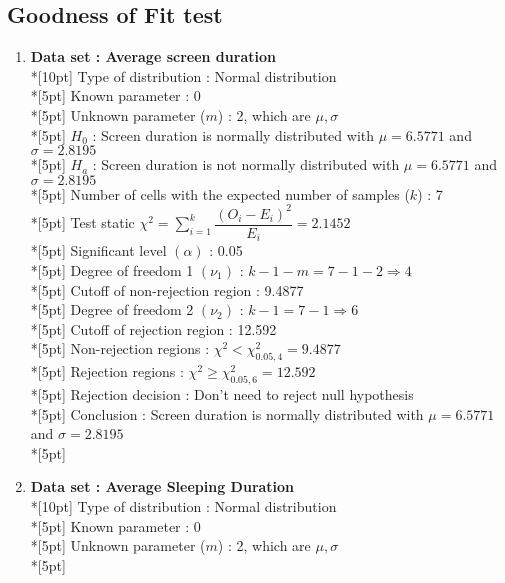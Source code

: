 \subsection*{Goodness of Fit test}
\begin{enumerate}
    \item \textbf{Data set : Average screen duration}\\*[10pt]
        Type of distribution : Normal distribution\\*[5pt]
        Known parameter : 0\\*[5pt]
        Unknown parameter ($m$) : 2, which are \(\mu, \sigma\)\\*[5pt]
        $H_0$ : Screen duration is normally distributed with $\mu=6.5771$ and $\sigma=2.8195$\\*[5pt]
        $H_a$ : Screen duration is not normally distributed with $\mu=6.5771$ and $\sigma=2.8195$\\*[5pt]
        Number of cells with the expected number of samples ($k$) : 7\\*[5pt]
        Test static \(\chi^2=\displaystyle\sum\limits^k_{i=1}\dfrac{\left(O_i-E_i\right)^2}{E_i} = 2.1452\)\\*[5pt]
        Significant level \(\left(\alpha\right)\) : 0.05\\*[5pt]
        Degree of freedom 1 \((\nu_1)\) : $k - 1 - m = 7 - 1 - 2 \Rightarrow 4$\\*[5pt]
        Cutoff of non-rejection region : 9.4877\\*[5pt]
        Degree of freedom 2 \((\nu_2)\) : $k - 1 = 7 - 1 \Rightarrow 6$\\*[5pt]
        Cutoff of rejection region : 12.592\\*[5pt]
        Non-rejection regions : \(\chi^2 < \chi^2_{0.05, 4}=9.4877\)\\*[5pt]
        Rejection regions : \(\chi^2 \geq \chi^2_{0.05, 6}=12.592\)\\*[5pt]
        Rejection decision : Don't need to reject null hypothesis\\*[5pt]
        Conclusion : Screen duration is normally distributed with $\mu=6.5771$ and $\sigma=2.8195$\\*[5pt]
    \item \textbf{Data set : Average Sleeping Duration}\\*[10pt]
        Type of distribution : Normal distribution\\*[5pt]
        Known parameter : 0\\*[5pt]
        Unknown parameter ($m$) : 2, which are \(\mu, \sigma\)\\*[5pt]

\end{enumerate}
